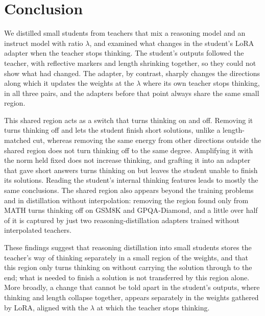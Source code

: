 \section{Conclusion}\label{sec:conclusion}

We distilled small students from teachers that mix a reasoning model and an instruct model with ratio $\lambda$, and examined what changes in the student's LoRA adapter when the teacher stops thinking. The student's outputs followed the teacher, with reflective markers and length shrinking together, so they could not show what had changed. The adapter, by contrast, sharply changes the directions along which it updates the weights at the $\lambda$ where its own teacher stops thinking, in all three pairs, and the adapters before that point always share the same small region.

This shared region acts as a switch that turns thinking on and off. Removing it turns thinking off and lets the student finish short solutions, unlike a length-matched cut, whereas removing the same energy from other directions outside the shared region does not turn thinking off to the same degree. Amplifying it with the norm held fixed does not increase thinking, and grafting it into an adapter that gave short answers turns thinking on but leaves the student unable to finish its solutions. Reading the student's internal thinking features leads to mostly the same conclusions. The shared region also appears beyond the training problems and in distillation without interpolation: removing the region found only from MATH turns thinking off on GSM8K and GPQA-Diamond, and a little over half of it is captured by just two reasoning-distillation adapters trained without interpolated teachers.

These findings suggest that reasoning distillation into small students stores the teacher's way of thinking separately in a small region of the weights, and that this region only turns thinking on without carrying the solution through to the end; what is needed to finish a solution is not transferred by this region alone. More broadly, a change that cannot be told apart in the student's outputs, where thinking and length collapse together, appears separately in the weights gathered by LoRA, aligned with the $\lambda$ at which the teacher stops thinking.
